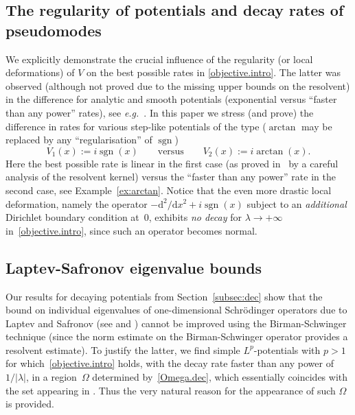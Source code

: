 \subsection*{The regularity of potentials 
and decay rates of pseudomodes}
We explicitly demonstrate the crucial influence of the regularity (or local deformations) of $V$ on the best possible rates in \eqref{objective.intro}. 
The latter was observed (although not proved due to the missing upper bounds on the resolvent) in the difference for analytic and smooth potentials (exponential versus ``faster than any power'' rates), 
see {\emph{e.g.}}~\cite{Davies_1999-NSA,Dencker-Sjostrand-Zworski_2004}. 
In this paper we stress (and prove) the difference in rates 
for various step-like potentials of the type
($\arctan$ may be replaced by any ``regularisation'' of ${\mathop{\mathrm{sgn}}\nolimits}$)
\begin{equation}\label{step-like}
V_1(x):= i {\mathop{\mathrm{sgn}}\nolimits}(x) 
\qquad \text{versus} \qquad 
V_2(x):= i \arctan(x).
\end{equation}	
Here the best possible rate is linear in the first case 
(as proved in~\cite{HK} by a careful analysis of 
the resolvent kernel) 
versus the ``faster than any power'' rate in the second case, 
see Example~\ref{ex:arctan}. 
Notice that the even more drastic local deformation, 
namely the operator $ -{{\mathrm{d}}^2}/{{\mathrm{d}} x^2} + i {\mathop{\mathrm{sgn}}\nolimits} (x)$ 
subject to an \emph{additional} 
Dirichlet boundary condition at~$0$, 
exhibits \emph{no decay} for $\lambda \to +\infty$ in~\eqref{objective.intro}, 
since such an operator becomes normal.

\subsection*{Laptev-Safronov eigenvalue bounds}
Our results for decaying potentials from Section~\ref{subsec:dec} 
show that the bound on individual eigenvalues
of one-di\-men\-sion\-al Schr\"odinger operators 
due to Laptev and Safronov
(see \cite[Thm.~5]{Laptev-Safronov_2009} and \cite[Open Problem 7.1]{AIM-2015})
cannot be improved using the Birman-Schwinger technique (since the norm estimate on the Birman-Schwinger operator provides a resolvent estimate). To justify the latter, we find simple $L^p$-potentials with $p>1$ for which~\eqref{objective.intro} holds, with the decay rate faster than any power of $1/|\lambda|$, in a region~$\Omega$ determined by~\eqref{Omega.dec},
which essentially coincides with the set appearing in \cite[Thm.~5]{Laptev-Safronov_2009}. Thus the very natural reason for the appearance of such $\Omega$ is provided. 

